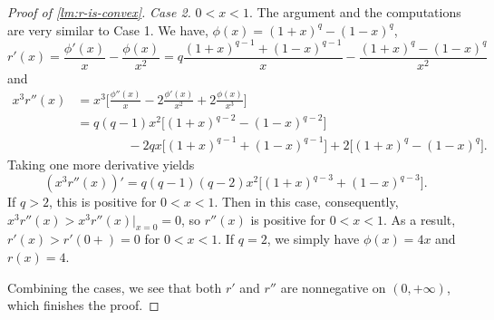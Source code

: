 \documentclass[10pt]{article}
\newcommand{\1}{\textbf{1}}
\newtheorem{lemma}[theorem]{Lemma}
\theoremstyle{remark}
\theoremstyle{definition}
\begin{document}
\begin{proof}[Proof of \ref{lm:r-is-convex}]
\bigskip
\noindent
\emph{Case 2.} $0 < x < 1$. The argument and the computations are very similar to Case 1. We have, $\phi(x) = (1+x)^q - (1-x)^q$,
\[
r'(x) = \frac{\phi'(x)}{x} - \frac{\phi(x)}{x^2} = q\frac{(1+x)^{q-1}+(1-x)^{q-1}}{x} - \frac{(1+x)^q-(1-x)^q}{x^2}
\]
and
\begin{align*}
x^3r''(x) &= x^3\Bigg[\frac{\phi''(x)}{x}-2\frac{\phi'(x)}{x^2}+2\frac{\phi(x)}{x^3}\Bigg] \\
&=q(q-1)x^2\Big[(1+x)^{q-2}-(1-x)^{q-2}\Big] \\
&\qquad\qquad-2qx\Big[(1+x)^{q-1}+(1-x)^{q-1}\Big]+ 2\Big[(1+x)^q-(1-x)^q\Big].
\end{align*}
Taking one more derivative yields
\[
(x^3r''(x))' = q(q-1)(q-2)x^2\Big[(1+x)^{q-3}+(1-x)^{q-3}\Big].
\]
If $q > 2$, this is positive for $0 < x  < 1$. Then in this case, consequently, $x^3r''(x) > x^3r''(x)\Big|_{x=0} = 0$, so $r''(x)$ is positive for $0 < x < 1$. As a result, $r'(x) > r'(0+) = 0$ for $0 < x < 1$. If $q = 2$, we simply have $\phi(x) = 4x$ and $r(x) = 4$. 

Combining the cases, we see that both $r'$ and $r''$ are nonnegative on $(0,+\infty)$, which finishes the proof.
\end{proof}

\end{document}
